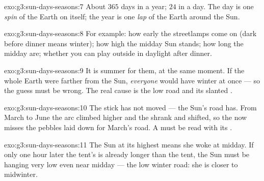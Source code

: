 \begin{solution}{exo:g3:sun-days-seasons:7}
About $365$ days in a year; $24$  in a day. The day is one
\emph{spin} of the Earth on itself; the year is one \emph{lap} of
the Earth around the Sun.
\end{solution}

\begin{solution}{exo:g3:sun-days-seasons:8}
For example: how early the streetlamps come on (dark before dinner
means winter); how high the midday Sun stands; how long the midday
 are; whether you can play outside in daylight after dinner.
\end{solution}

\begin{solution}{exo:g3:sun-days-seasons:9}
It is summer for them, at the same moment. If the whole Earth were
farther from the Sun, \emph{everyone} would have winter at once ---
so the guess must be wrong. The real cause is the low road and its
slanted .
\end{solution}

\begin{solution}{exo:g3:sun-days-seasons:10}
The stick has not moved --- the Sun's road has. From March to June
the arc climbed higher and the  shrank and shifted, so the
 now misses the pebbles laid down for March's road. A 
must be read with its .
\end{solution}

\begin{solution}{exo:g3:sun-days-seasons:11}
The Sun at its highest means she woke at midday. If only one hour
later the tent's  is already longer than the tent, the Sun
must be hanging very low even near midday --- the low winter road:
she is closer to midwinter.
\end{solution}
